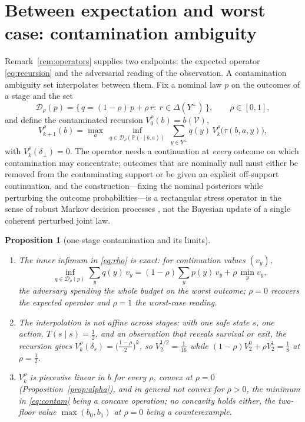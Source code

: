 \documentclass[11pt,a4paper]{article}
\theoremstyle{plain}
\newtheorem{proposition}[theorem]{Proposition}
\theoremstyle{definition}
\theoremstyle{remark}
\newcommand{\Prob}{\mathbb{P}}
\newcommand{\calV}{\mathcal{V}}
\newcommand{\calD}{\mathcal{D}}
\newcommand{\tfr}[2]{\tfrac{#1}{#2}}
\begin{document}
\section{Between expectation and worst case: contamination ambiguity}\label{sec:dr}

Remark~\ref{rem:operators} supplies two endpoints: the expected operator \eqref{eq:recursion} and the adversarial reading of the observation. A contamination ambiguity set \cite{Huber1964} interpolates between them. Fix a nominal law $p$ on the outcomes of a stage and the set
\[
\calD_\rho(p)=\{\,q=(1-\rho)\,p+\rho\,r:\ r\in\Delta(Y^{\bot})\,\},\qquad \rho\in[0,1],
\]
and define the contaminated recursion $V^{\rho}_0(b)=b(\calV)$,
\begin{equation}\label{eq:rho}
V^{\rho}_{k+1}(b)=\max_{a}\ \inf_{q\in\calD_\rho(\Prob(\cdot\mid b,a))}\ \sum_{y\in Y^{\bot}}q(y)\,V^{\rho}_k\bigl(\tau(b,a,y)\bigr),
\end{equation}
with $V^{\rho}_k(\delta_\bot)=0$. The operator needs a continuation at \emph{every} outcome on which contamination may concentrate; outcomes that are nominally null must either be removed from the contaminating support or be given an explicit off-support continuation, and the construction---fixing the nominal posteriors while perturbing the outcome probabilities---is a rectangular stress operator in the sense of robust Markov decision processes \cite{Iyengar2005,NilimElGhaoui2005}, not the Bayesian update of a single coherent perturbed joint law.

\begin{proposition}[one-stage contamination and its limits]\label{prop:dr}
\begin{enumerate}[leftmargin=1.6em,itemsep=1pt]
\item[(i)] The inner infimum in \eqref{eq:rho} is exact: for continuation values $(v_y)$,
\begin{equation}\label{eq:contam}
\inf_{q\in\calD_\rho(p)}\sum_y q(y)\,v_y=(1-\rho)\sum_y p(y)\,v_y+\rho\,\min_y v_y ,
\end{equation}
the adversary spending the whole budget on the worst outcome; $\rho=0$ recovers the expected operator and $\rho=1$ the worst-case reading.
\item[(ii)] The interpolation is not affine across stages: with one safe state $s$, one action, $T(s\mid s)=\tfr12$, and an observation that reveals survival or exit, the recursion gives $V^{\rho}_k(\delta_s)=\bigl(\tfr{1-\rho}2\bigr)^{k}$, so $V^{1/2}_2=\tfr1{16}$ while $(1-\rho)V^{0}_2+\rho V^{1}_2=\tfr18$ at $\rho=\tfr12$.
\item[(iii)] $V^{\rho}_k$ is piecewise linear in $b$ for every $\rho$, convex at $\rho=0$ (Proposition~\ref{prop:alpha}), and in general not convex for $\rho>0$, the minimum in \eqref{eq:contam} being a concave operation; no concavity holds either, the two-floor value $\max(b_0,b_1)$ at $\rho=0$ being a counterexample.
\end{enumerate}
\end{proposition}
\end{document}
